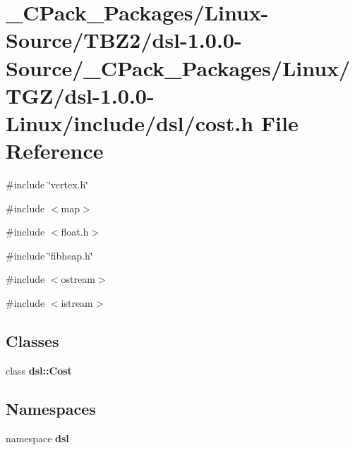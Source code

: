 \section{\_\-CPack\_\-Packages/Linux-\/Source/TBZ2/dsl-\/1.0.0-\/Source/\_\-CPack\_\-Packages/Linux/TGZ/dsl-\/1.0.0-\/Linux/include/dsl/cost.h File Reference}
\label{__CPack__Packages_2Linux-Source_2TBZ2_2dsl-1_80_80-Source_2__CPack__Packages_2Linux_2TGZ_2dsl-1_930c77b345b4984b54614339ab0bde2b}
{\ttfamily \#include \char`\"{}vertex.h\char`\"{}}\par
{\ttfamily \#include $<$map$>$}\par
{\ttfamily \#include $<$float.h$>$}\par
{\ttfamily \#include \char`\"{}fibheap.h\char`\"{}}\par
{\ttfamily \#include $<$ostream$>$}\par
{\ttfamily \#include $<$istream$>$}\par
\subsection*{Classes}
\begin{DoxyCompactItemize}
\item 
class {\bf dsl::Cost}
\end{DoxyCompactItemize}
\subsection*{Namespaces}
\begin{DoxyCompactItemize}
\item 
namespace {\bf dsl}
\end{DoxyCompactItemize}
